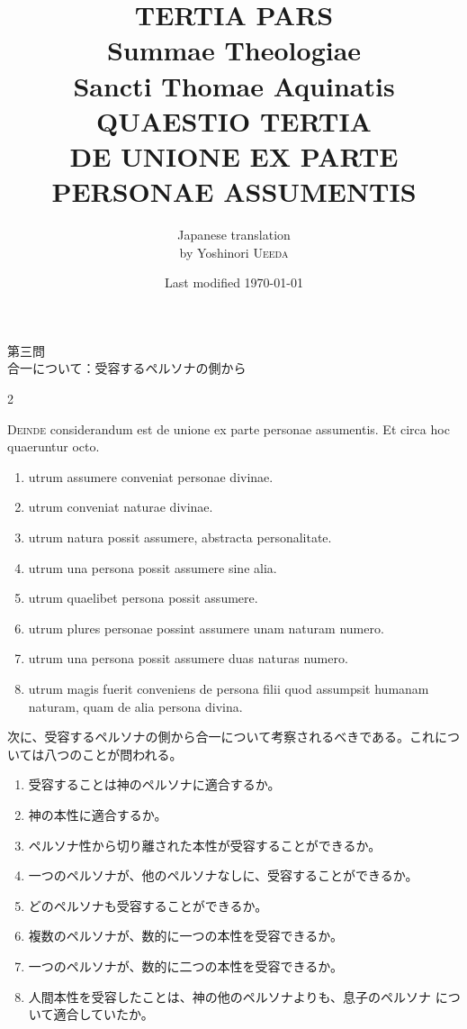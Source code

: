 \documentclass[paper=a4paper,fontsize=10pt,jafontsize=9pt,titlepage]{jlreq}
\title{{\bfseries TERTIA PARS}\\{\Huge Summae Theologiae}\\Sancti Thomae
Aquinatis\\{\sffamily QUAESTIO TERTIA}\\DE UNIONE EX PARTE PERSONAE
ASSUMENTIS}
\author{Japanese translation\\by Yoshinori {\scshape Ueeda}}
\date{Last modified \today}
\begin{document}
\maketitle
\pagestyle{fancy}



\begin{center}
{\Large 第三問\\合一について：受容するペルソナの側から}
\end{center}



\begin{paracol}{2}

{\Huge D}{\scshape einde} considerandum est de unione ex parte personae assumentis. Et
circa hoc quaeruntur octo. 


\begin{enumerate}
 \item utrum assumere conveniat personae divinae.
 \item utrum conveniat naturae divinae. 
 \item utrum natura possit assumere, abstracta personalitate.
 \item utrum una persona possit assumere sine alia.
 \item utrum quaelibet persona possit assumere.
 \item utrum plures personae possint assumere unam naturam numero. 
 \item utrum una persona possit assumere duas naturas numero.
 \item utrum magis fuerit conveniens de persona filii quod assumpsit humanam naturam, quam de alia persona divina.
\end{enumerate}

\switchcolumn

次に、受容するペルソナの側から合一について考察されるべきである。これにつ
 いては八つのことが問われる。

\begin{enumerate}
 \item 受容することは神のペルソナに適合するか。
 \item 神の本性に適合するか。
 \item ペルソナ性から切り離された本性が受容することができるか。
 \item 一つのペルソナが、他のペルソナなしに、受容することができるか。
 \item どのペルソナも受容することができるか。
 \item 複数のペルソナが、数的に一つの本性を受容できるか。
 \item 一つのペルソナが、数的に二つの本性を受容できるか。
 \item 人間本性を受容したことは、神の他のペルソナよりも、息子のペルソナ
       について適合していたか。
\end{enumerate}

\end{paracol}
\newpage
{}
{}
\setcounter{section}{1}
\setcounter{subsection}{0}
\end{document}
